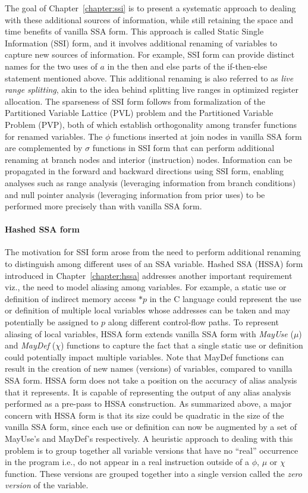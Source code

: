 The goal of Chapter~\ref{chapter:ssi} is to present a systematic approach to dealing with these additional sources of information, while still retaining the space and time benefits of vanilla SSA form.  This approach is called Static Single Information (SSI) form, and it involves additional renaming of variables to capture new sources of information.  For example, SSI form can provide distinct names for the two uses of $a$ in the then and else parts of the if-then-else statement mentioned above.  This additional renaming is also referred to as {\em live range splitting}, akin to the idea behind splitting live ranges in optimized register allocation.  The sparseness of SSI form follows from formalization of the Partitioned Variable Lattice (PVL)  problem and the Partitioned Variable Problem (PVP), both of which establish orthogonality among transfer functions for renamed variables.  The $\phi$ functions inserted at join nodes in vanilla SSA form are complemented by $\sigma$ functions in SSI form that can perform additional renaming at branch nodes and interior (instruction) nodes.  Information can be propagated in the forward and backward directions using SSI form, enabling analyses such as range analysis (leveraging information from branch conditions) and null pointer analysis (leveraging information from prior uses) to be performed more precisely than with vanilla SSA form.

\paragraph{Hashed SSA form}

The motivation for SSI form arose from the need to perform additional renaming to distinguish among different uses of an SSA variable.  Hashed SSA (HSSA) form introduced in Chapter~\ref{chapter:hssa} addresses another important requirement viz., the need to model aliasing among variables.  For example, a static use or definition of indirect memory access $*p$ in the C language could represent the use or definition of multiple local variables whose addresses can be taken and may potentially be assigned to $p$ along different control-flow paths.  To represent aliasing of local variables, HSSA form extends vanilla SSA form with  {\em MayUse} ($\mu$) and {\em MayDef} ($\chi$) functions to capture the fact that a single static use or definition could potentially impact multiple variables.  Note that MayDef functions can result in the creation of new names (versions) of variables, compared to vanilla SSA form.  HSSA form does not take a position on the accuracy of alias analysis that it represents.  It is capable of representing the output of any alias analysis performed as a pre-pass to HSSA construction.
As summarized above, a major concern with HSSA form is that its size could be quadratic in the size of the vanilla SSA form, since each use or definition can now be augmented by a set of MayUse's and MayDef's respectively.  A heuristic approach to dealing with this problem is to group together all variable versions that have no ``real'' occurrence in the program i.e., do not appear in a real instruction outside of a $\phi$, $\mu$ or $\chi$ function.  These versions are grouped together into a single version called the {\em zero version} of the variable.

